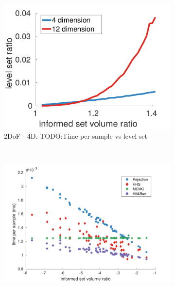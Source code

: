 \documentclass[letterpaper, 10 pt, conference]{ieeeconf}  %
\begin{document}
\begin{figure}[t!]
	\centering
	\begin{subfigure}[b]{0.78\linewidth}
		\includegraphics[width=\linewidth]{fig/sampling_efficiency/levelset}
		\caption{2DoF - 4D. TODO:Time per sample vs level set}
		\label{fig:sampling_efficiency:levelset}
	\end{subfigure}
	 \\
	\begin{subfigure}[b]{0.78\linewidth}
		\includegraphics[width=\linewidth]{fig/sampling_efficiency/sample_efficiency_2d}

\end{subfigure}
\end{figure}
\end{document}
